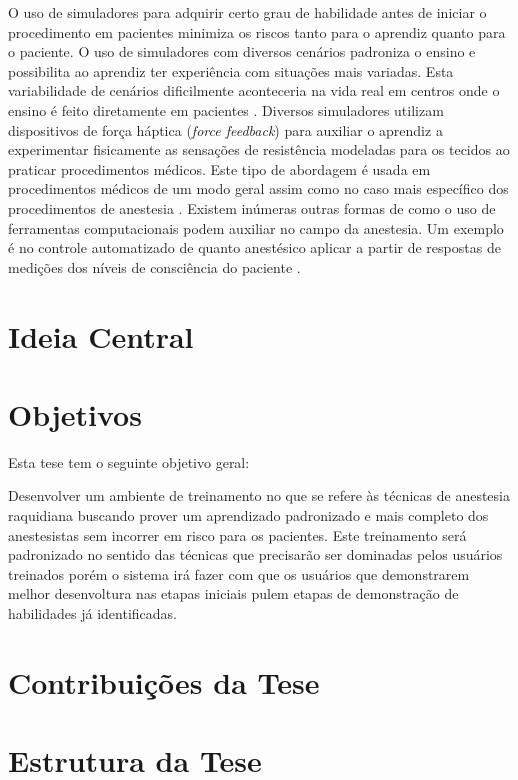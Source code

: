O uso de simuladores para adquirir certo grau de habilidade antes de iniciar o procedimento em pacientes minimiza os riscos tanto para o aprendiz quanto para o paciente. O uso de simuladores com diversos cenários padroniza o ensino e possibilita ao aprendiz ter experiência com situações mais variadas.  Esta variabilidade de cenários dificilmente aconteceria na vida real em centros onde o ensino é feito diretamente em pacientes \cite{Udani2015}. Diversos simuladores utilizam dispositivos de força háptica (\textit{force feedback}) para auxiliar o aprendiz a experimentar fisicamente as sensações de resistência modeladas para os tecidos ao praticar procedimentos médicos. Este tipo de abordagem é usada em procedimentos médicos de um modo geral \cite{Escobar-Castillejos2016} assim como no caso mais específico dos procedimentos de anestesia \cite{Vaughan2013}. Existem inúmeras outras formas de como o uso de ferramentas computacionais podem auxiliar no campo da anestesia. Um exemplo é no controle automatizado de quanto anestésico aplicar a partir de respostas de medições dos níveis de consciência do paciente \cite{Mendez2009}.

\section{Ideia Central}


\section{Objetivos}
\label{sec:objetivos}

Esta tese tem o seguinte objetivo geral:

Desenvolver um ambiente de treinamento no que se refere às técnicas de anestesia raquidiana buscando prover um aprendizado padronizado e mais completo dos anestesistas sem incorrer em risco para os pacientes. Este treinamento será padronizado no sentido das técnicas que precisarão ser dominadas pelos usuários treinados  porém o sistema irá fazer com que os usuários que demonstrarem melhor desenvoltura nas etapas iniciais pulem etapas de demonstração de habilidades já identificadas.  

\section{Contribuições da Tese}
\label{sec:contribuicoes}



\section{Estrutura da Tese}
\label{sec:estrutura}

